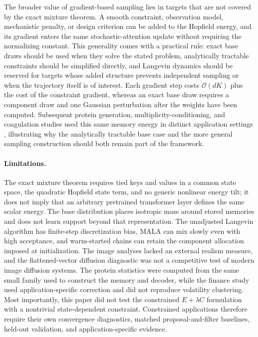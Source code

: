 The broader value of gradient-based sampling lies in targets that are not
covered by the exact mixture theorem. A smooth constraint, observation model,
mechanistic penalty, or design criterion can be added to the Hopfield energy,
and its gradient enters the same stochastic-attention update without requiring
the normalizing constant. This generality comes with a practical rule: exact
base draws should be used when they solve the stated problem, analytically
tractable constraints should be simplified directly, and Langevin dynamics
should be reserved for targets whose added structure prevents independent
sampling or when the trajectory itself is of interest. Each gradient step
costs $\mathcal O(dK)$ plus the cost of the constraint gradient, whereas an
exact base draw requires a component draw and one Gaussian perturbation after
the weights have been computed. Subsequent protein generation,
multiplicity-conditioning, and coagulation studies used this same memory
energy in distinct application settings
\cite{varnerTrainingFreeProtein2026,varnerConditioningProtein2026,varnerSyntheticPatient2026},
illustrating why the analytically tractable base case and the more general
sampling construction should both remain part of the framework.

\paragraph{Limitations.}
The exact mixture theorem requires tied keys and values in a common state
space, the quadratic Hopfield state term, and no generic nonlinear energy tilt;
it does not imply that an arbitrary pretrained transformer layer defines the
same scalar energy. The base distribution places isotropic mass around stored
memories and does not learn support beyond that representation. The unadjusted
Langevin algorithm has finite-step discretization bias, MALA can mix slowly
even with high acceptance, and warm-started chains can retain the component allocation imposed at
initialization. The image analyses lacked an external realism measure, and the
flattened-vector diffusion diagnostic was not a competitive test of modern
image diffusion systems. The protein statistics were computed from the same
small family used to construct the memory and decoder, while the finance study
used application-specific correction and did not reproduce volatility
clustering. Most importantly, this paper did not test the constrained
$E+\lambda C$ formulation with a nontrivial state-dependent constraint.
Constrained applications therefore require their own convergence diagnostics,
matched proposal-and-filter baselines, held-out validation, and
application-specific evidence.
